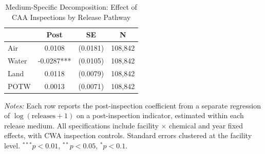 \begin{table}[htbp]
\centering
\caption{Medium-Specific Decomposition: Effect of CAA Inspections by Release Pathway}
\label{tab:decomp}
\begin{tabular}{lccc}
\toprule
& Post & SE & N \\
\midrule
Air & 0.0108 & (0.0181) & 108,842 \\[3pt]
Water & -0.0287*** & (0.0105) & 108,842 \\[3pt]
Land & 0.0118 & (0.0079) & 108,842 \\[3pt]
POTW & 0.0013 & (0.0071) & 108,842 \\[3pt]
\bottomrule
\end{tabular}
\begin{minipage}{0.95\textwidth}
\vspace{0.3em}
\footnotesize \textit{Notes:} Each row reports the post-inspection coefficient from a separate regression of $\log(\text{releases} + 1)$ on a post-inspection indicator, estimated within each release medium. All specifications include facility $\times$ chemical and year fixed effects, with CWA inspection controls. Standard errors clustered at the facility level. $^{***}p<0.01$, $^{**}p<0.05$, $^{*}p<0.1$.
\end{minipage}
\end{table}
